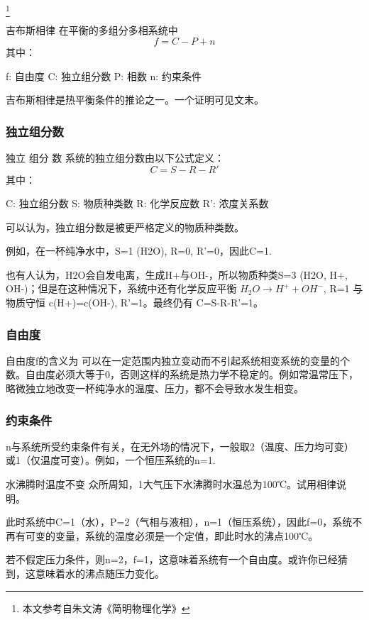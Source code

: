 
\footnote{本文参考自朱文涛《简明物理化学》}

\begin{theorem}{吉布斯相律}
在平衡的多组分多相系统中
\begin{equation}
f=C-P+n
\end{equation}
其中：

f: 自由度
C: 独立组分数
P: 相数
n: 约束条件
\end{theorem}
吉布斯相律是热平衡条件的推论之一。一个证明可见文末。

\subsubsection{独立组分数}
\begin{definition}{独立 组分 数}
系统的独立组分数由以下公式定义：
\begin{equation}
C=S-R-R'
\end{equation}
其中：

C: 独立组分数
S: 物质种类数
R: 化学反应数
R': 浓度关系数
\end{definition}

可以认为，独立组分数是被更严格定义的物质种类数。

例如，在一杯纯净水中，S=1 (H2O), R=0, R'=0，因此C=1.

也有人认为，H2O会自发电离，生成H+与OH-，所以物质种类S=3 (H2O, H+, OH-)；但是在这种情况下，系统中还有化学反应平衡 $H_2O\rightarrow H^++OH^-$, R=1 与物质守恒 c(H+)=c(OH-), R'=1。最终仍有 C=S-R-R'=1。

\subsubsection{自由度}
自由度f的含义为 可以在一定范围内独立变动而不引起系统相变系统的变量的个数。自由度必须大等于0，否则这样的系统是热力学不稳定的。例如常温常压下，略微独立地改变一杯纯净水的温度、压力，都不会导致水发生相变。

\subsubsection{约束条件}
n与系统所受约束条件有关，在无外场的情况下，一般取2（温度、压力均可变）或1（仅温度可变）。例如，一个恒压系统的n=1.

\begin{example}{水沸腾时温度不变}
众所周知，1大气压下水沸腾时水温总为100℃。试用相律说明。

此时系统中C=1（水），P=2（气相与液相），n=1（恒压系统），因此f=0，系统不再有可变的变量，系统的温度必须是一个定值，即此时水的沸点100℃。

若不假定压力条件，则n=2，f=1，这意味着系统有一个自由度。或许你已经猜到，这意味着水的沸点随压力变化。
\end{example}

